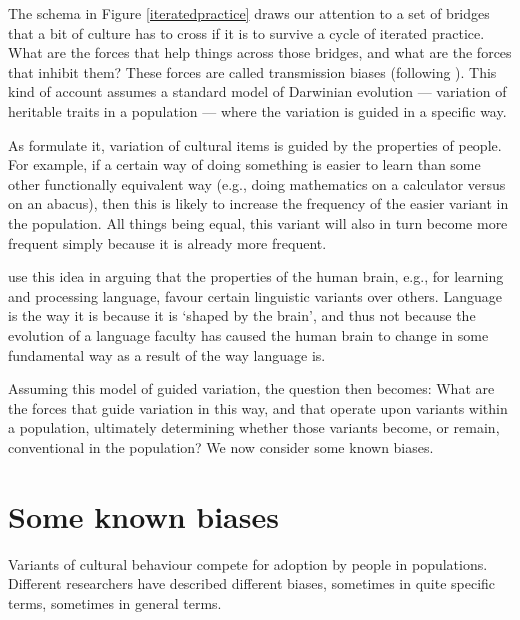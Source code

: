 The schema in Figure \ref{iteratedpractice} draws our attention to a set of bridges that a bit 
of culture has to cross if it is to survive a cycle of iterated 
practice. What are the forces that help things across those 
bridges, and what are the forces that inhibit them? These forces are 
called transmission biases (following \citealt{boyd_culture_1985,boyd_origin_2005}). 
This kind of account assumes a standard model of Darwinian 
evolution --- variation of heritable traits in a population --- where 
the variation is guided in a specific way. 



As \citet{boyd_culture_1985} formulate it, variation of cultural items 
is guided by the properties of people. For example, if a certain 
way of doing something is easier to learn than some other functionally 
equivalent way (e.g., doing mathematics on a calculator versus on an abacus), 
then this is likely to increase the frequency of the easier 
variant in the population. All things being equal, this variant 
will also in turn become more frequent simply because it is already 
more frequent. 



\citet{christiansen_language_2008} use this idea in arguing that the 
properties of the human brain, e.g., for learning and 
processing language, favour certain linguistic variants over others. Language is the way it is because it is \textquoteleft shaped by the 
brain', and thus not because the evolution of a language faculty has 
caused the human brain to change in some fundamental way as a result of 
the way language is. 



Assuming this model of guided variation, the question then becomes: What 
are the forces that guide variation in this way, and that 
operate upon variants within a population, ultimately 
determining whether those variants become, or remain, conventional in the 
population? We now consider some known biases.



\section{Some known biases}
\label{someknownbiases}

Variants of cultural behaviour compete for adoption by people in populations. Different researchers have described different 
biases, sometimes in quite specific terms, sometimes in general terms. 



